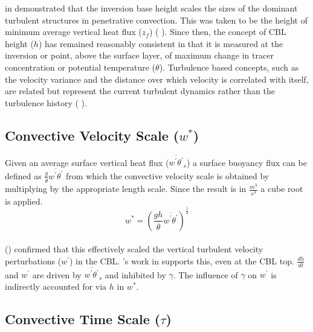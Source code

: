 \citeauthor{Deardorff72} in \cite{Deardorff72} demonstrated that the inversion base height
scales the sizes of the dominant turbulent structures in penetrative convection.
This was taken to be the height of minimum average vertical heat flux ($z_{f}$) 
(\citeauthor{DearWill80} \cite{DearWill80}).  Since then, the concept of 
\acs{CBL} height ($h$) has remained reasonably consistent in that it is measured at the inversion or point,
above the surface layer, of maximum change in tracer concentration or potential temperature ($\theta$). Turbulence based concepts, 
such as the velocity variance and the distance over which velocity is correlated with itself,
are related but represent the current turbulent dynamics rather than the turbulence history (\citeauthor{Traum11} \cite{Traum11}).\\

\subsection{Convective Velocity Scale ($w^{*}$)}
\label{subsec:}

Given an average surface vertical heat flux ($\overline{w^{'}\theta^{'}}_{s}$) a surface buoyancy flux can be defined as 
$\frac{g}{\overline{\theta}}\overline{w^{'}\theta^{'}}$ from which the convective velocity scale is obtained by
multiplying by the appropriate length scale.  Since the result is in $\frac{m^{3}}{s^{3}}$ a cube root is applied.\\

\begin{equation}
w^{*} = \left( \frac{gh}{\overline{\theta}}\overline{w^{'}\theta^{'}} \right)^{\frac{1}{3}}
\end{equation}\\

\citeauthor{Deardorff70} (\cite{Deardorff70}) confirmed that this effectively scaled the vertical turbulent velocity
perturbations ($w^{'}$) in the \acs{CBL}.  \citeauthor{Sorbjan}'s work in \cite{Sorbjan} supports this, even at the 
\acs{CBL} top.  $\frac{dh}{dt}$ and $w^{'}$ are driven by $\overline{w^{'}\theta^{'}}_{s}$ and inhibited by  $\gamma$. 
The influence of $\gamma$ on $w^{'}$ is indirectly accounted for via $h$ in $w^{*}$.\\

\subsection{Convective Time Scale ($\tau$)}
\label{sec:}

